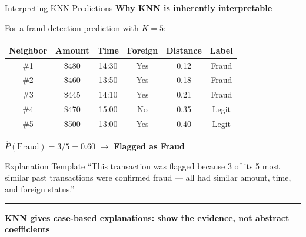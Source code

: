 \documentclass[8pt,aspectratio=169]{beamer}
\newcommand{\bottomnote}[1]{%
\vfill
\vspace{-2mm}
\textcolor{mllavender2}{\rule{\textwidth}{0.4pt}}
\vspace{1mm}
\footnotesize
\textbf{#1}
}
\begin{document}
\begin{frame}[t]{Interpreting KNN Predictions}
\small
\textbf{Why KNN is inherently interpretable}

\vspace{2mm}
\footnotesize
For a fraud detection prediction with $K{=}5$:

\vspace{2mm}
\begin{tabular}{cccccc}
\toprule
\textbf{Neighbor} & \textbf{Amount} & \textbf{Time} & \textbf{Foreign} & \textbf{Distance} & \textbf{Label} \\
\midrule
\#1 & \$480 & 14:30 & Yes & 0.12 & \textcolor{mlred}{Fraud} \\
\#2 & \$460 & 13:50 & Yes & 0.18 & \textcolor{mlred}{Fraud} \\
\#3 & \$445 & 14:10 & Yes & 0.21 & \textcolor{mlred}{Fraud} \\
\#4 & \$470 & 15:00 & No  & 0.35 & \textcolor{mlgreen}{Legit} \\
\#5 & \$500 & 13:00 & Yes & 0.40 & \textcolor{mlgreen}{Legit} \\
\bottomrule
\end{tabular}

\vspace{3mm}
$\hat{P}(\text{Fraud}) = 3/5 = 0.60$ \quad $\to$ \textcolor{mlred}{\textbf{Flagged as Fraud}}

\vspace{3mm}
\begin{block}{Explanation Template}
\footnotesize ``This transaction was flagged because 3 of its 5 most similar past transactions were confirmed fraud --- all had similar amount, time, and foreign status.''
\end{block}
\bottomnote{KNN gives case-based explanations: show the evidence, not abstract coefficients}
\end{frame}
\end{document}

